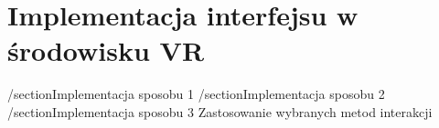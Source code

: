 \chapter{Implementacja interfejsu w środowisku VR}

/section{Implementacja sposobu 1}
/section{Implementacja sposobu 2}
/section{Implementacja sposobu 3}
Zastosowanie wybranych metod interakcji
